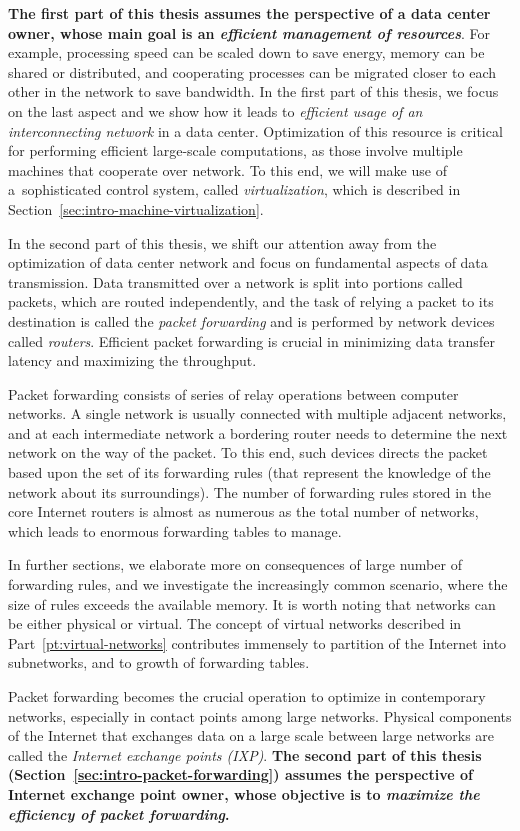 \textbf{The first part of this thesis assumes the perspective of a data center owner, whose main goal is an \emph{efficient management of resources}}.
For example, processing speed can be scaled down to save energy, memory can be shared or distributed, and cooperating processes can be migrated closer to each other in the network to save bandwidth.
In the first part of this thesis, we focus on the last aspect and we show how it leads to
\emph{efficient usage of an interconnecting network} in a data center.
Optimization of this resource is critical for performing efficient large-scale computations, as those involve multiple machines that cooperate over network.
To this end, we will make use of a~sophisticated control system, called \emph{virtualization}, which is described in Section~\ref{sec:intro-machine-virtualization}.


In the second part of this thesis, we shift our attention away from the optimization of data center network and focus on fundamental aspects of data transmission.
Data transmitted over a network is split into portions called packets, which are routed independently, and the task of relying a packet to its destination is called the \emph{packet forwarding} and is performed by network devices called \emph{routers}.
Efficient packet forwarding is crucial in minimizing data transfer latency and maximizing the throughput.

Packet forwarding consists of series of relay operations between computer networks.
A single network is usually connected with multiple adjacent networks, and at each intermediate network a bordering router needs to determine the next network on the way of the packet.
To this end, such devices directs the packet based upon the set of its forwarding rules (that represent the knowledge of the network about its surroundings).
The number of forwarding rules stored in the core Internet routers is almost as numerous as the total number of networks, which leads to enormous forwarding tables to manage.

In further sections, we elaborate more on consequences of large number of forwarding rules, and we investigate the increasingly common scenario, where the size of rules exceeds the available memory.
It is worth noting that networks can be either physical or virtual.
The concept of virtual networks described in Part~\ref{pt:virtual-networks} contributes immensely to partition of the Internet into subnetworks, and to growth of forwarding tables.


Packet forwarding becomes the crucial operation to optimize in contemporary networks, especially in contact points among large networks.
Physical components of the Internet that exchanges data on a large scale between large networks are called the \emph{Internet exchange points (IXP)}.
\textbf{The second part of this thesis (Section~\ref{sec:intro-packet-forwarding}) assumes the perspective of Internet exchange point owner, whose objective is to \emph{maximize the efficiency of packet forwarding}.}


